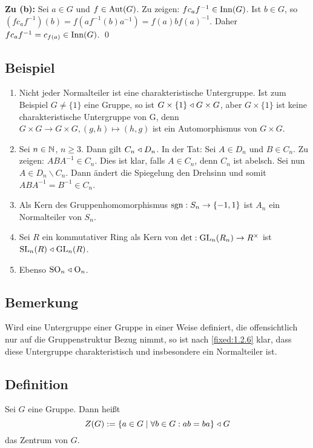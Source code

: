 \textbf{Zu (b):} Sei $a \in G$ und $f \in \operatorname{Aut}(G)$. Zu zeigen: $fc_af^{-1} \in \operatorname{Inn}(G)$. Ist $b \in G$, so $(fc_af^{-1})(b)=f\left(af^{-1}(b)a^{-1}\right) = f(a)bf(a)^{-1}$. Daher $fc_af^{-1}=c_{f(a)} \in \operatorname{Inn}(G)$. \qed
		
\subsection{Beispiel}
\begin{enumerate}[label={\alph*)}]
	\item
		Nicht jeder Normalteiler ist eine charakteristische Untergruppe. Ist zum Beispiel $G \neq \{1\}$ eine Gruppe, so ist $G\times \{1\} \mathrel\triangleleft G\times G$, aber $G\times \{1\}$ ist keine charakteristische Untergruppe von G, denn $G \times G \to G \times G, (g,h) \mapsto (h,g)$ ist ein Automorphismus von $G\times G$.
		
	\item
		Sei $n \in \mathbb N$, $n \geq 3$. Dann gilt $C_n \mathrel\triangleleft D_n$. In der Tat: Sei $A \in D_n$ und $B \in C_n$. Zu zeigen: $ABA^{-1} \in C_n$. Dies ist klar, falls $A \in C_n$, denn $C_n$ ist abelsch. Sei nun $A \in D_n \backslash C_n$. Dann ändert die Spiegelung den Drehsinn und somit $ABA^{-1}=B^{-1} \in C_n$.
		
	\item
		Als Kern des Gruppenhomomorphismus $\operatorname{sgn} : S_n \to \{-1,1\}$ ist $A_n$ ein  Normalteiler von $S_n$.
		
	\item Sei $R$ ein kommutativer Ring als Kern von $\det : \operatorname{GL}_n(R_n) \to R^{\times}$ ist $\operatorname{SL}_n(R) \mathrel\triangleleft \operatorname{GL}_n(R)$.
	
	\item Ebenso $\operatorname{SO}_n \mathrel\triangleleft \text{O}_n$.
\end{enumerate}

\subsection{Bemerkung} Wird eine Untergruppe einer Gruppe in einer Weise definiert, die offensichtlich nur auf die Gruppenstruktur Bezug nimmt, so ist nach \ref{fixed:1.2.6} klar, dass diese Untergruppe charakteristisch und insbesondere ein Normalteiler ist.
	
\subsection{Definition}	Sei $G$ eine Gruppe. Dann heißt
$$Z(G):=\{a \in G \mid \forall b \in G: ab = ba\} \mathrel\triangleleft G$$
das Zentrum von $G$.

